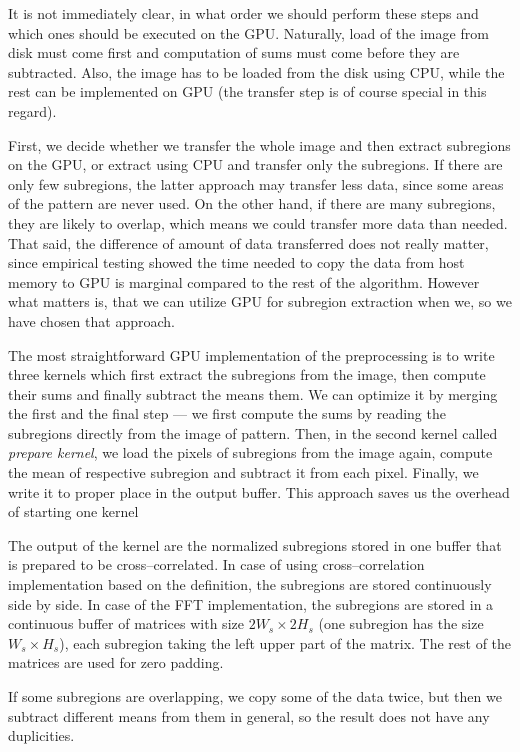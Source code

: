 It is not immediately clear, in what order we should perform these steps and which ones should be executed on the GPU. Naturally, load of the image from disk must come first and computation of sums must come before they are subtracted. Also, the image has to be loaded from the disk using CPU, while the rest can be implemented on GPU (the transfer step is of course special in this regard).

First, we decide whether we transfer the whole image and then extract subregions on the GPU, or extract using CPU and transfer only the subregions. If there are only few subregions, the latter approach may transfer less data, since some areas of the pattern are never used. On the other hand, if there are many subregions, they are likely to overlap, which means we could transfer more data than needed. That said, the difference of amount of data transferred does not really matter, since empirical testing showed the time needed to copy the data from host memory to GPU is marginal compared to the rest of the algorithm. However what matters is, that we can utilize GPU for subregion extraction when we, so we have chosen that approach.

The most straightforward GPU implementation of the preprocessing is to write three kernels which first extract the subregions from the image, then compute their sums and finally subtract the means them. We can optimize it by merging the first and the final step --- we first compute the sums by reading the subregions directly from the image of pattern. Then, in the second kernel called \emph{prepare kernel}, we load the pixels of subregions from the image again, compute the mean of respective subregion and subtract it from each pixel. Finally, we write it to proper place in the output buffer. This approach saves us the overhead of starting one kernel

The output of the kernel are the normalized subregions stored in one buffer that is prepared to be cross--correlated. In case of using cross--cor\-re\-la\-ti\-on implementation based on the definition, the subregions are stored continuously side by side. In case of the FFT implementation, the subregions are stored in a continuous buffer of matrices with size $2W_s \times 2H_s$ (one subregion has the size $W_s \times H_s$), each subregion taking the left upper part of the matrix. The rest of the matrices are used for zero padding.

If some subregions are overlapping, we copy some of the data twice, but then we subtract different means from them in general, so the result does not have any duplicities.

